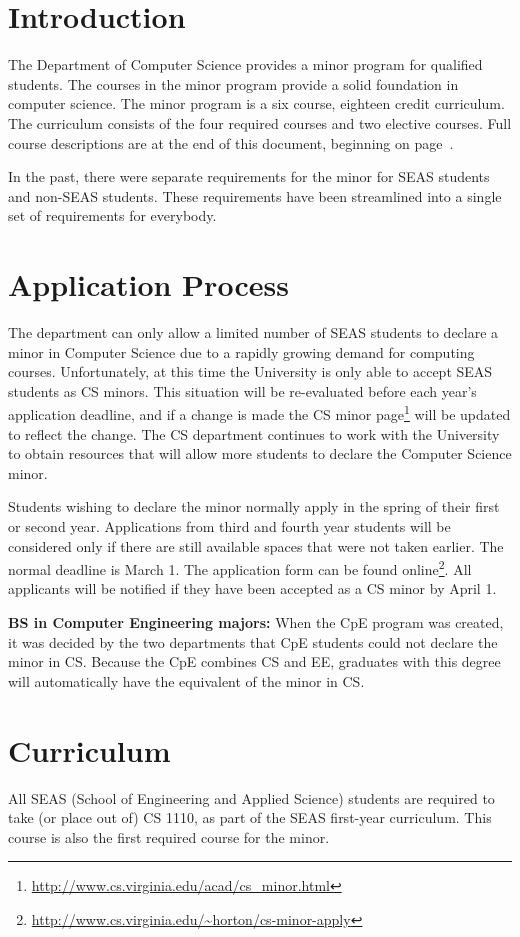 \documentclass[10pt,letter]{book}
\newcommand{\mysection}[1]{\section{#1}\renewcommand{\rightmark}{#1}}
\newcommand{\myurl}[1]{\footnote{\scriptsize\url{#1}}}
\begin{document}
\mysection{Introduction}

The Department of Computer Science provides a minor program for
qualified students. The courses in the minor program provide a solid
foundation in computer science. The minor program is a six course,
eighteen credit curriculum. The curriculum consists of the four
required courses and two elective courses. Full course descriptions
are at the end of this document, beginning on
page~\pageref{sec:coursedesc}.

In the past, there were separate requirements for the minor for SEAS
students and non-SEAS students.  These requirements have been
streamlined into a single set of requirements for everybody.
 
\mysection{Application Process}


The department can only allow a limited number of SEAS students to
declare a minor in Computer Science due to a rapidly growing demand
for computing courses.  Unfortunately, at this time the University is
only able to accept SEAS students as CS minors. This situation will be
re-evaluated before each year's application deadline, and if a change
is made the CS minor
page\myurl{http://www.cs.virginia.edu/acad/cs_minor.html} will be
updated to reflect the change. The CS department continues to work
with the University to obtain resources that will allow more students
to declare the Computer Science minor.

Students wishing to declare the minor normally apply in the spring of
their first or second year. Applications from third and fourth year
students will be considered only if there are still available spaces
that were not taken earlier. The normal deadline is March 1. The
application form can be found
online\myurl{http://www.cs.virginia.edu/~horton/cs-minor-apply}.  All
applicants will be notified if they have been accepted as a CS minor
by April 1.

{\bf BS in Computer Engineering majors:} When the CpE program was created,
it was decided by the two departments that CpE students could not
declare the minor in CS. Because the CpE combines CS and EE, graduates
with this degree will automatically have the equivalent of the minor
in CS.

\mysection{Curriculum}

All SEAS (School of Engineering and Applied Science) students are
required to take (or place out of) CS 1110, as part of the SEAS
first-year curriculum. This course is also the first required course
for the minor.
\end{document}

